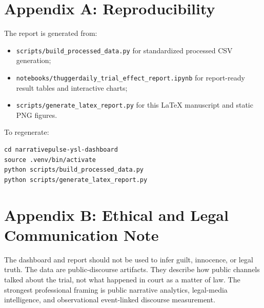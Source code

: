 \documentclass[12pt]{article}
\begin{document}
\section{Appendix A: Reproducibility}
The report is generated from:
\begin{itemize}[leftmargin=*]
\item \texttt{scripts/build\_processed\_data.py} for standardized processed CSV generation;
\item \texttt{notebooks/thuggerdaily\_trial\_effect\_report.ipynb} for report-ready result tables and interactive charts;
\item \texttt{scripts/generate\_latex\_report.py} for this LaTeX manuscript and static PNG figures.
\end{itemize}

To regenerate:
\begin{verbatim}
cd narrativepulse-ysl-dashboard
source .venv/bin/activate
python scripts/build_processed_data.py
python scripts/generate_latex_report.py
\end{verbatim}

\section{Appendix B: Ethical and Legal Communication Note}
The dashboard and report should not be used to infer guilt, innocence, or legal truth. The data are public-discourse artifacts. They describe how public channels talked about the trial, not what happened in court as a matter of law. The strongest professional framing is public narrative analytics, legal-media intelligence, and observational event-linked discourse measurement.
\end{document}
